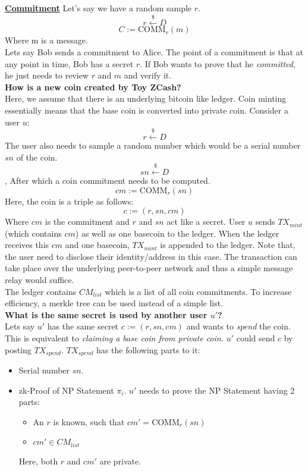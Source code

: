 \documentclass[twoside]{article}
\begin{document}
\underline{\textbf{Commitment}}
Let's say we have a random sample $r$. 
$$r \xleftarrow{\$} D$$
$$ C := \text{COMM}_r(m) $$
Where m is a message. \\
Lets say Bob sends a commitment to Alice. The point of a commitment is that at any point in time, Bob has a secret $r$. If Bob wants to prove that he \textit{committed}, he just needs to review $r$ and $m$ and verify it.  \\

\textbf{How is a new coin created by Toy ZCash?} \\ 
Here, we assume that there is an underlying bitcoin like ledger. Coin minting essentially means that the base coin is converted into private coin. Consider a user $u$: 
$$ r \xleftarrow{\$}{} D$$ 
The user also needs to sample a random number which would be a serial number $sn$ of the coin. 
$$ sn \xleftarrow{\$} D$$, After which a coin commitment needs to be computed. 
$$ cm := \text{COMM}_r(sn)$$
Here, the coin is a triple as follows:
$$ c := (r, sn, cm) $$
Where $cm$ is the commitment and $r$ and $sn$ act like a secret. User $u$ sends $TX_{mint}$ (which contains $cm$) as well as one basecoin to the ledger. When the ledger receives this $cm$ and one basecoin, $TX_{mint}$ is appended to the ledger. Note that, the user need to disclose their identity/address in this case. The transaction can take place over the underlying peer-to-peer network and thus a simple message relay would suffice. \\

The ledger contains $CM_{list}$ which is a list of all coin commitments. To increase efficiency, a merkle tree can be used instead of a simple list. \\

\textbf{What is the same secret is used by another user $u'$?} \\
Lets say $u'$ has the same secret $c := (r, sn, cm)$ and wants to \textit{spend} the coin. This is equivalent to \textit{claiming a base coin from private coin.} $u'$ could send $c$ by posting $TX_{spend}$. $TX_{spend}$ has the following parts to it: 
\begin{itemize}
    \item Serial number $sn$.
    \item zk-Proof of NP Statement $\pi_i$. $u'$ needs to prove the NP Statement having 2 parts:
    \begin{itemize}
        \item An $r$ is known, such that $cm' = \text{COMM}_r(sn)$
        \item $cm' \in CM_{list}$
    \end{itemize}
    Here, both $r$ and $cm'$ are private. 
\end{itemize}
\end{document}
